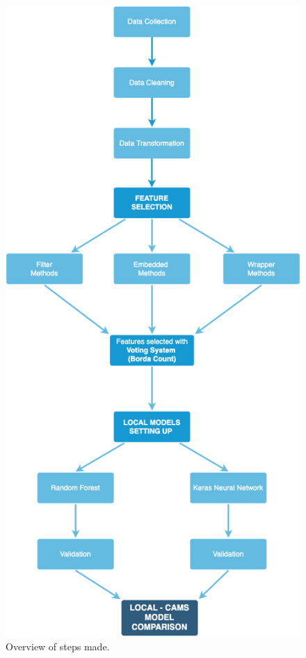\begin{figure}[b]
      \centering
    \includegraphics[scale=0.4]{images/overview.png}
    \caption{Overview of steps made.}
    \label{fig:overview}
\end{figure}